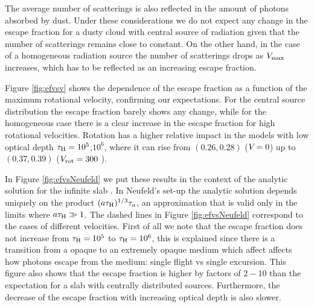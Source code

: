 \documentclass{emulateapj}
\newcommand{\ly}{{\ifmmode{{\rm Ly}\alpha~}\else{Ly$\alpha$~}\fi}}
\newcommand{\kms}{{\ifmmode{{\mathrm{\,km\ s}^{-1}}}\else{\,km~s$^{-1}$}\fi}}
\begin{document}
The average number of scatterings is also reflected in the amount of
photons absorbed by dust. Under these considerations we do not expect
any change in the escape fraction for a dusty cloud with central
source of radiation given that the number of scatterings remains close
to constant. On the other hand, in the case of a homogeneous
radiation source the number of scatterings drops as $V_{\rm max}$
increases, which has to be reflected as an increasing escape fraction.

Figure \ref{fig:efvsv} shows the dependence of the escape fraction as
a function of the maximum rotational velocity, confirming our expectations. For the central source
distribution the escape fraction barely shows any change, while for
the homogeneous case there is a clear increase in the escape fraction for
high rotational velocities.  Rotation has a higher relative impact in
the models with low optical depth $\tau_{\rm H}=10^5$,$10^{6}$, where
it can rise from $(0.26, 0.28)$ ($V_{\rm}=0$\kms) up to $(0.37, 0.39)$ ($V_{\rm
  rot}=300$ \kms). 

In Figure \ref{fig:efvsNeufeld} we put these results in the context of
the analytic solution for the infinite slab \citep{Neufeld90}. In
Neufeld's set-up the analytic solution depends uniquely on the product
$(a\tau_{\rm   H})^{1/3}\tau_{a}$, an approximation that is valid only
in the limits where $a\tau_{\rm   H}\gg 1$. The dashed lines in Figure
\ref{fig:efvsNeufeld} correspond to the cases of different
velocities. First of all we note that the escape fraction does not
increase from $\tau_{\rm H}=10^{5}$ to $\tau_{\rm H}=10^{6}$, this is
explained since there is a transition from a opaque to an extremely opaque medium
which affect affects how \ly photons escape from the medium: single flight 
vs single excursion.
This figure also shows that the escape fraction is higher by factors of $2-10$
than the expectation for a slab with centrally distributed
sources. Furthermore, the decrease of the escape fraction with
increasing optical depth is also slower.
\end{document}
